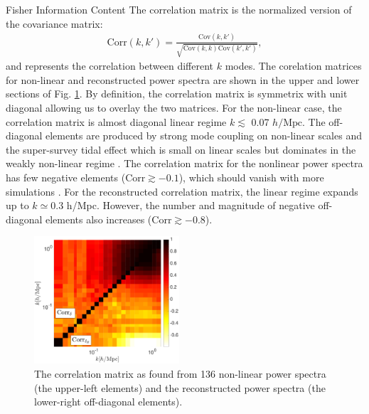 \begin{section}{Fisher Information Content}
  The correlation matrix is the normalized version of the covariance
  matrix:
  \begin{align}
    \mathrm{Corr}\left(k,k'\right)=\frac{\mathrm{Cov}\left(k,k'\right)}
    {\sqrt{\mathrm{Cov}\left(k,k\right)\mathrm{Cov}\left(k',k'\right)}},
  \end{align}
  and represents the correlation between different $k$ modes.  The
  corelation matrices for non-linear and reconstructed power spectra
  are shown in the upper and lower sections of Fig. \ref{fig:corrall}.
  By definition, the correlation matrix is symmetrix with unit
  diagonal allowing us to overlay the two matrices.  For the
  non-linear case, the correlation matrix is almost diagonal linear
  regime $k \lesssim$ 0.07 $h/\mathrm{Mpc}$.  The off-diagonal
  elements are produced by strong mode coupling on non-linear scales
  and the super-survey tidal effect which is small on linear scales
  but dominates in the weakly non-linear regime
  \cite{bib:Kazuyuki2016}.  The correlation matrix for the nonlinear
  power spectra has few negative elements
  ($\mathrm{Corr} \gtrsim -0.1$), which should vanish with more
  simulations \cite{bib:Takahashi2009}.  For the reconstructed
  correlation matrix, the linear regime expands up to $k \simeq 0.3$
  h/Mpc.  However, the number and magnitude of negative off-diagonal
  elements also increases ($\mathrm{Corr} \gtrsim -0.8$).

  \begin{figure}
    \centering
    \includegraphics[width=0.48\textwidth]{fig3.pdf}
    \caption{The correlation matrix as found from 136 non-linear power
      spectra (the upper-left elements) and the reconstructed power
      spectra (the lower-right off-diagonal elements).}
    \label{fig:corrall}
  \end{figure}


\end{section}

